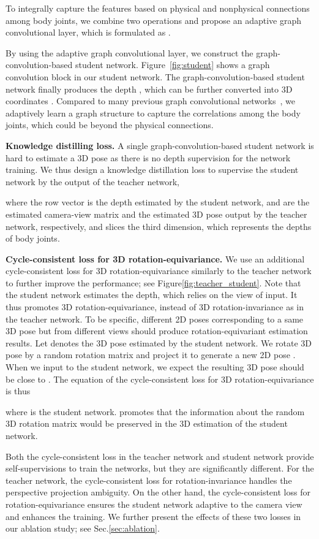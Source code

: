 \documentclass[letterpaper]{article} \usepackage{aaai21}  \usepackage{times}  \usepackage{helvet} \usepackage{courier}  \usepackage[hyphens]{url}  \usepackage{graphicx} \urlstyle{rm} \def\UrlFont{\rm}  \usepackage{natbib}  \usepackage{caption} \frenchspacing  \setlength{\pdfpagewidth}{8.5in}  \setlength{\pdfpageheight}{11in}
\begin{document}
To integrally capture the features based on physical and nonphysical connections among body joints, we combine two operations and propose an adaptive graph convolutional layer, which is formulated as .

By using the adaptive graph convolutional layer, we construct the graph-convolution-based student network. Figure~\ref{fig:student} shows a graph convolution block in our student network. The graph-convolution-based student network finally produces the depth , which can be further converted into 3D coordinates . Compared to many previous graph convolutional networks~\cite{kipf2016semi}, we adaptively learn a graph structure to capture the correlations among the body joints, which could be beyond the physical connections.

\textbf{Knowledge distilling loss.}
A single graph-convolution-based student network is hard to estimate a 3D pose as there is no depth supervision for the network training. We thus design a knowledge distillation loss to supervise the student network by the output of the teacher network, 

where the row vector  is the depth estimated by the student network,  and  are the estimated camera-view matrix and the estimated 3D pose output by the teacher network, respectively, and  slices the third dimension, which represents the depths of body joints. 

\textbf{Cycle-consistent loss for 3D rotation-equivariance.}
We use an additional cycle-consistent loss for 3D rotation-equivariance similarly to the teacher network to further improve the performance; see Figure\ref{fig:teacher_student}. Note that the student network estimates the depth, which relies on the view of input. It thus promotes 3D rotation-equivariance, instead of 3D rotation-invariance as in the teacher network. To be specific, different 2D poses corresponding to a same 3D pose but from different views should produce rotation-equivariant estimation results. Let  denotes the 3D pose estimated by the student network. We rotate 3D pose  by a random rotation matrix  and project it to generate a new 2D pose . When we input  to the student network, we expect the resulting 3D pose should be close to . The equation of the cycle-consistent loss for 3D rotation-equivariance is thus

where  is the student network.  promotes that the information about the random 3D rotation matrix would be preserved in the 3D estimation of the student network. 

Both the cycle-consistent loss in the teacher network and student network provide self-supervisions to train the networks, but they are significantly different. For the teacher network, the cycle-consistent loss for rotation-invariance handles the perspective projection ambiguity. On the other hand, the cycle-consistent loss for rotation-equivariance ensures the student network adaptive to the camera view and enhances the training. We further present the effects of these two losses in our ablation study; see Sec.\ref{sec:ablation}.
\end{document}
